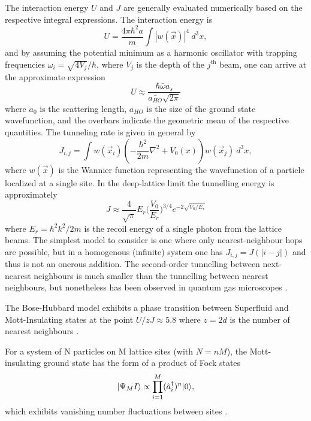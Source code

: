 	The interaction energy $U$ and $J$ are generally evaluated numerically  based on the respective integral expressions.
	The interaction energy is
	\begin{equation}
		U = \frac{4\pi\hbar^2 a}{m}\int |w(\vec{x})|^4~d^3 x,
	\end{equation}
	and by assuming the potential minimum as a harmonic oscillator with trapping frequencies $\omega_i = \sqrt{4 V_j}/\hbar$, where $V_j$ is the depth of the $j^{\textrm{th}}$ beam, one can arrive at the approximate expression 
	\begin{equation}
		U \approx \frac{\hbar \bar{\omega}a_s}{\bar{a_{HO}}\sqrt{2\pi}}
	\end{equation}
	where $a_0$ is the scattering length, $a_{HO}$ is the size of the ground state wavefunction, and the overbars indicate the geometric mean of the respective quantities.
	\cite{Jaksch98}
	The tunneling rate is given in general by \cite{Jaksch98}
	\begin{equation}
		J_{i,j} = \int w(\vec{x}_i) \left(-\frac{\hbar^2}{2m}\nabla^2 + V_0(x)\right)w(\vec{x}_j)~d^3 x,
	\end{equation}
	where $w(\vec{x})$ is the Wannier function \cite{Wannier37,Marzari00} representing the wavefunction of a particle localized at a single site.
	In the deep-lattice limit the tunnelling energy is approximately \cite{Jaksch98}
	\begin{equation}
		J \approx \frac{4}{\sqrt{\pi}} E_r\Big(\frac{V_0}{E_r}\Big)^{3/4}e^{-2\sqrt{V_0/E_r}}
	\end{equation}
	where $E_r = \hbar^2k^2/2m$ is the recoil energy of a single photon from the lattice beams.
	The simplest model to consider is one where only nearest-neighbour hops are possible, but in a homogenous (infinite) system one has $J_{i,j} = J(|i-j|)$ and thus is not an onerous addition.
	The second-order tunnelling between next-nearest neighbours is much smaller than the tunnelling between nearest neighbours, but nonetheless has been observed in quantum gas microscopes \cite{Folling07}.
	
	The Bose-Hubbard model exhibits a phase transition between Superfluid and Mott-Insulating states at the point $U/zJ \approx 5.8$ where $z=2d$ is the number of nearest neighbours \cite{Jaksch98}.
	
	For a system of N particles on M lattice sites (with $N = nM$), the  Mott-insulating ground state has the form of a product of Fock states
	\begin{equation}
		|\Psi_MI\rangle \propto \prod_{i=1}^M (\hat{a}^\dagger_i)^n|0\rangle,
	\end{equation}
	which exhibits vanishing number fluctuations between sites \cite{Greiner02}.
	
